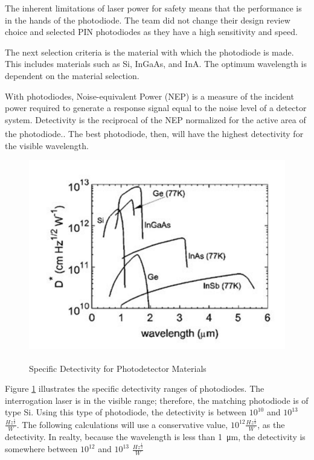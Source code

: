 \documentclass[letterpaper,10pt]{article}
\begin{document}
\begin{spacing}{1.15}
The inherent limitations of laser power for safety means that the performance is in the hands of the photodiode. The team did not change their design review choice and selected PIN photodiodes as they have a high sensitivity and speed.

The next selection criteria is the material with which the photodiode is made. This includes materials such as Si, InGaAs, and InA. The optimum wavelength is dependent on the material selection.

With photodiodes, Noise-equivalent Power (NEP) is a measure of the incident power required to generate a response signal equal to the noise level of a detector system. Detectivity is the reciprocal of the NEP normalized for the active area of the photodiode.\textsuperscript{\cite{Microphotonics}}. The best photodiode, then, will have the highest detectivity for the visible wavelength.  

\begin{figure} [H]
	\centering
	\includegraphics[scale=0.4]{detectivity-table.png}
	\label{fig:detectivity-table}
	\caption{Specific Detectivity for Photodetector Materials \textsuperscript{\cite{Optical}} \label{fig:detectivity-table}}
\end{figure}

Figure \ref{fig:detectivity-table} illustrates the specific detectivity ranges of photodiodes. The interrogation laser is in the visible range; therefore, the matching photodiode is of type Si. Using this type of photodiode, the detectivity is between $10^{10}$ and $10^{13}$ $\frac{Hz^{\frac{1}{2}}}{W}$. The following calculations will use a conservative value, $10^{12} \frac{Hz^{\frac{1}{2}}}{W}$, as the detectivity. In realty, because the wavelength is less than \SI{1}{\micro\meter}, the detectivity is somewhere between $10^{12}$ and $10^{13}$ $\frac{Hz^{\frac{1}{2}}}{W}$


\end{spacing}
\end{document}
